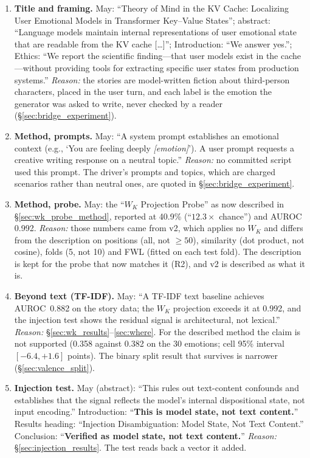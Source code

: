 \begin{enumerate}[leftmargin=*]
    \item \textbf{Title and framing.} May: ``Theory of Mind in the KV Cache: Localizing User Emotional Models in Transformer Key--Value States''; abstract: ``Language models maintain internal representations of user emotional state that are readable from the KV cache [\ldots]''; Introduction: ``We answer yes.''; Ethics: ``We report the scientific finding---that user models exist in the cache---without providing tools for extracting specific user states from production systems.'' \emph{Reason:} the stories are model-written fiction about third-person characters, placed in the user turn, and each label is the emotion the generator was asked to write, never checked by a reader (\S\ref{sec:bridge_experiment}).

    \item \label{app:item:prompts}\textbf{Method, prompts.} May: ``A system prompt establishes an emotional context (e.g., `You are feeling deeply \textit{[emotion]}'). A user prompt requests a creative writing response on a neutral topic.'' \emph{Reason:} no committed script used this prompt. The driver's prompts and topics, which are charged scenarios rather than neutral ones, are quoted in \S\ref{sec:bridge_experiment}.

    \item \textbf{Method, probe.} May: the ``$W_K$ Projection Probe'' as now described in \S\ref{sec:wk_probe_method}, reported at 40.9\% (``$12.3\times$ chance'') and AUROC 0.992. \emph{Reason:} those numbers came from v2, which applies no $W_K$ and differs from the description on positions (all, not $\geq 50$), similarity (dot product, not cosine), folds (5, not 10) and FWL (fitted on each test fold). The description is kept for the probe that now matches it (R2), and v2 is described as what it is.

    \item \textbf{Beyond text (TF-IDF).} May: ``A TF-IDF text baseline achieves AUROC~0.882 on the story data; the $W_K$ projection exceeds it at 0.992, and the injection test shows the residual signal is architectural, not lexical.'' \emph{Reason:} \S\ref{sec:wk_results}--\ref{sec:where}. For the described method the claim is not supported (0.358 against 0.382 on the 30 emotions; cell 95\% interval $[-6.4, +1.6]$ points). The binary split result that survives is narrower (\S\ref{sec:valence_split}).

    \item \textbf{Injection test.} May (abstract): ``This rules out text-content confounds and establishes that the signal reflects the model's internal dispositional state, not input encoding.'' Introduction: ``\textbf{This is model state, not text content.}'' Results heading: ``Injection Disambiguation: Model State, Not Text Content.'' Conclusion: ``\textbf{Verified as model state, not text content.}'' \emph{Reason:} \S\ref{sec:injection_results}. The test reads back a vector it added.


\end{enumerate}
